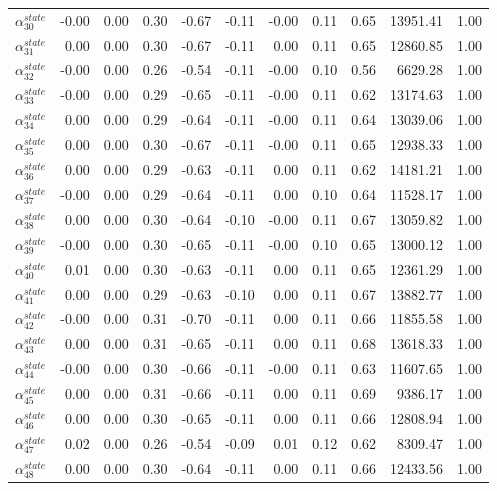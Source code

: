 \documentclass[12pt,english,a4paper]{article}
\begin{document}
\begin{table}[ht]
\begin{tabular}{rrrrrrrrrrr}
  $\alpha_{30}^{state}$ & -0.00 & 0.00 & 0.30 & -0.67 & -0.11 & -0.00 & 0.11 & 0.65 & 13951.41 & 1.00 \\ 
  $\alpha_{31}^{state}$ & 0.00 & 0.00 & 0.30 & -0.67 & -0.11 & 0.00 & 0.11 & 0.65 & 12860.85 & 1.00 \\ 
  $\alpha_{32}^{state}$ & -0.00 & 0.00 & 0.26 & -0.54 & -0.11 & -0.00 & 0.10 & 0.56 & 6629.28 & 1.00 \\
  $\alpha_{33}^{state}$ & -0.00 & 0.00 & 0.29 & -0.65 & -0.11 & -0.00 & 0.11 & 0.62 & 13174.63 & 1.00 \\ 
  $\alpha_{34}^{state}$ & 0.00 & 0.00 & 0.29 & -0.64 & -0.11 & -0.00 & 0.11 & 0.64 & 13039.06 & 1.00 \\
  $\alpha_{35}^{state}$ & 0.00 & 0.00 & 0.30 & -0.67 & -0.11 & -0.00 & 0.11 & 0.65 & 12938.33 & 1.00 \\
  $\alpha_{36}^{state}$ & 0.00 & 0.00 & 0.29 & -0.63 & -0.11 & 0.00 & 0.11 & 0.62 & 14181.21 & 1.00 \\ 
  $\alpha_{37}^{state}$ & -0.00 & 0.00 & 0.29 & -0.64 & -0.11 & 0.00 & 0.10 & 0.64 & 11528.17 & 1.00 \\
  $\alpha_{38}^{state}$ & 0.00 & 0.00 & 0.30 & -0.64 & -0.10 & -0.00 & 0.11 & 0.67 & 13059.82 & 1.00 \\
  $\alpha_{39}^{state}$ & -0.00 & 0.00 & 0.30 & -0.65 & -0.11 & -0.00 & 0.10 & 0.65 & 13000.12 & 1.00 \\ 
  $\alpha_{40}^{state}$ & 0.01 & 0.00 & 0.30 & -0.63 & -0.11 & 0.00 & 0.11 & 0.65 & 12361.29 & 1.00 \\ 
  $\alpha_{41}^{state}$ & 0.00 & 0.00 & 0.29 & -0.63 & -0.10 & 0.00 & 0.11 & 0.67 & 13882.77 & 1.00 \\ 
  $\alpha_{42}^{state}$ & -0.00 & 0.00 & 0.31 & -0.70 & -0.11 & 0.00 & 0.11 & 0.66 & 11855.58 & 1.00 \\
  $\alpha_{43}^{state}$ & 0.00 & 0.00 & 0.31 & -0.65 & -0.11 & 0.00 & 0.11 & 0.68 & 13618.33 & 1.00 \\ 
  $\alpha_{44}^{state}$ & -0.00 & 0.00 & 0.30 & -0.66 & -0.11 & -0.00 & 0.11 & 0.63 & 11607.65 & 1.00 \\ 
  $\alpha_{45}^{state}$ & 0.00 & 0.00 & 0.31 & -0.66 & -0.11 & 0.00 & 0.11 & 0.69 & 9386.17 & 1.00 \\ 
  $\alpha_{46}^{state}$ & 0.00 & 0.00 & 0.30 & -0.65 & -0.11 & 0.00 & 0.11 & 0.66 & 12808.94 & 1.00 \\ 
  $\alpha_{47}^{state}$ & 0.02 & 0.00 & 0.26 & -0.54 & -0.09 & 0.01 & 0.12 & 0.62 & 8309.47 & 1.00 \\ 
  $\alpha_{48}^{state}$ & 0.00 & 0.00 & 0.30 & -0.64 & -0.11 & 0.00 & 0.11 & 0.66 & 12433.56 & 1.00 \\ 

\end{tabular}
\end{table}
\end{document}
